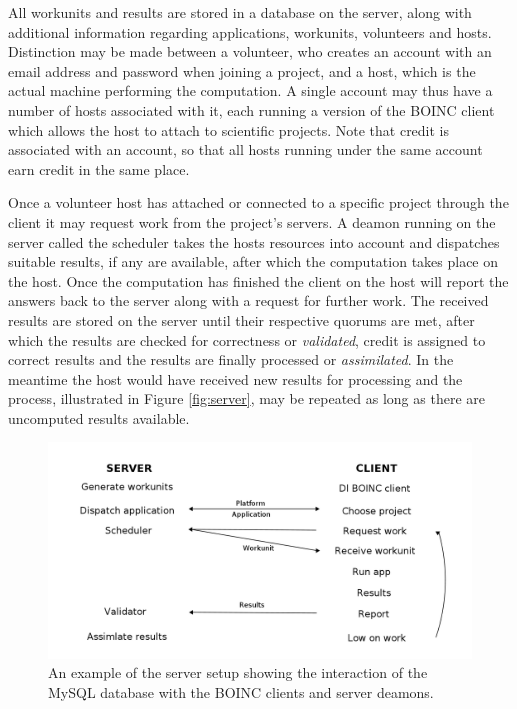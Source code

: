 All workunits and results are stored in a database on the server, along with additional information regarding applications, workunits, volunteers and hosts. Distinction may be made between a volunteer, who creates an account with an email address and password when joining a project, and a host, which is the actual machine performing the computation. A single account may thus have a number of hosts associated with it, each running a version of the BOINC client which allows the host to attach to scientific projects. Note that credit is associated with an account, so that all hosts running under the same account earn credit in the same place.

Once a volunteer host has attached or connected to a specific project through the client it may request work from the project's servers. 
A deamon running on the server called the scheduler takes the hosts resources into account and dispatches suitable results, if any are available, after which the computation takes place on the host. 
Once the computation has finished the client on the host will  report the answers back to the server along with a   request for further work. 
The received results are stored on the server until their respective quorums are met, after which the results are checked for correctness or \emph{validated},   credit is assigned to correct results and the results are finally processed or \emph{assimilated}. 
In the meantime the host would have received new results for processing and the process, illustrated in Figure \ref{fig:server}, may be repeated as long as there are uncomputed results available.
\begin{figure}[htb]
\centering
\includegraphics[width=14cm]{images/workflow}
\caption{An example of the server setup showing the interaction of the MySQL database with the BOINC clients and server deamons.}\label{fig:workflow}
\end{figure}


